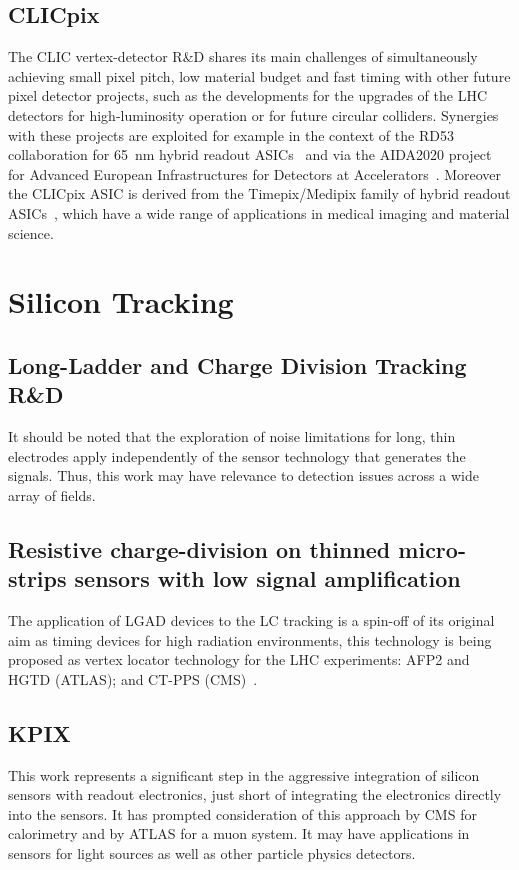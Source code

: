 \subsection{CLICpix}
The CLIC vertex-detector R\&D shares its main challenges of simultaneously achieving small pixel pitch,
low material budget and fast timing with other future pixel detector projects, such as the developments for
the upgrades of the LHC detectors for high-luminosity operation or for future circular colliders.
Synergies with these projects are exploited for example in the context of the RD53 collaboration for \SI{65}{nm} hybrid readout
ASICs~\cite{RD53} and via the AIDA2020 project for Advanced European Infrastructures for Detectors at
Accelerators~\cite{AIDA2020}.
Moreover the CLICpix ASIC is derived from the
Timepix/Medipix family of hybrid readout ASICs~\cite{medipix-collaboration}, which have a wide range of applications in
medical imaging and material science.

\section{Silicon Tracking}
\subsection{Long-Ladder and Charge Division Tracking R\&D}

It should be noted that the exploration of noise limitations for long, thin electrodes apply independently
of the sensor technology that generates the signals. Thus, this work may have
relevance to detection issues across a wide array of fields.

\subsection{Resistive charge-division on thinned micro-strips sensors with low signal amplification}
The application of LGAD devices to the LC tracking is a spin-off of its original aim as timing devices for high radiation environments, this technology is being proposed as vertex locator technology for the LHC experiments: AFP2 and HGTD (ATLAS); and CT-PPS (CMS)~\cite{Sadrozinski:CPAD2015,DallaTorre:2018ttn}.

\subsection{KPIX}
This work represents a significant step in the aggressive integration of silicon sensors with readout electronics, just short of integrating the electronics directly into the sensors. It has prompted consideration of this approach by CMS for calorimetry and by ATLAS for a muon system.  It may have applications in sensors for light sources as well as other particle physics detectors.

